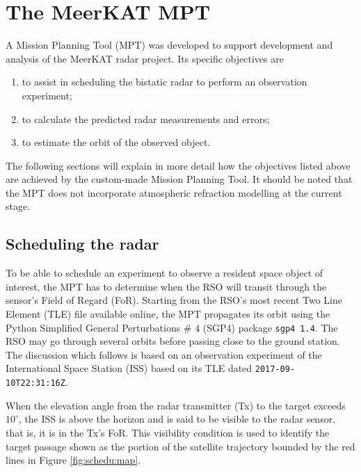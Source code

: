\documentclass[conference]{IEEEtran}
\begin{document}
\section{The MeerKAT MPT} \label{section:mpt}
A Mission Planning Tool (MPT) was developed to support development and analysis of the MeerKAT radar project. Its specific objectives are 
\begin{enumerate}
	\item to assist in scheduling the bistatic radar to perform an observation experiment;
	\item to calculate the predicted radar measurements and errors;
	\item to estimate the orbit of the observed object.
\end{enumerate}

The following sections will explain in more detail how the objectives listed above are achieved by the custom-made Mission Planning Tool. It should be noted that the MPT does not incorporate atmospheric refraction modelling at the current stage.

\subsection{Scheduling the radar} \label{subsection:schedu}
To be able to schedule an experiment to observe a resident space object of interest, the MPT has to determine when the RSO will transit through the sensor's Field of Regard (FoR). Starting from the RSO's most recent Two Line Element (TLE) file available online, the MPT propagates its orbit using the Python Simplified General Perturbations \# 4 (SGP4) package \verb|sgp4 1.4|. \cite{pysgp4} The RSO may go through several orbits before passing close to the ground station. The discussion which follows is based on an observation experiment of the International Space Station (ISS) based on its TLE dated \verb|2017-09-10T22:31:16Z|.

When the elevation angle from the radar transmitter (Tx) to the target exceeds $10^\circ$, the ISS is above the horizon and is said to be visible to the radar sensor, that is, it is in the Tx's FoR. This visibility condition is used to identify the target passage shown as the portion of the satellite trajectory bounded by the red lines in Figure \ref{fig:schedu:map}.
\end{document}
